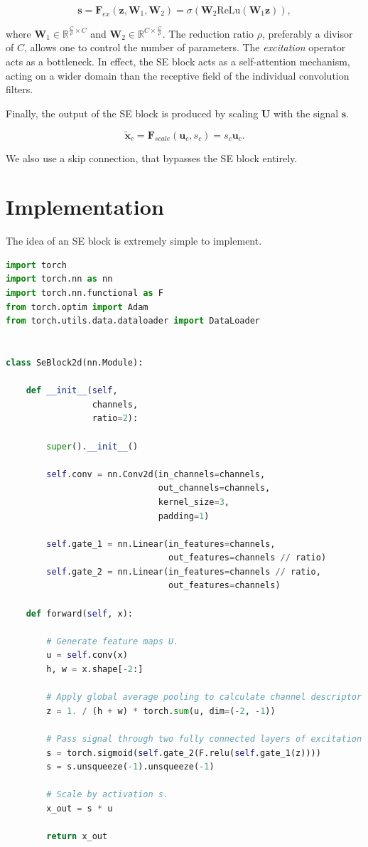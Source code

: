 \documentclass[6pt,oneside]{article}
\newcommand{\Real}{\mathbb{R}}
\newcommand{\vect}[1]{\boldsymbol{#1}}
\begin{document}
$$
\vect{s} = \vect{F}_{ex}(\vect{z}, \vect{W}_1, \vect{W}_2)
=
\sigma( \vect{W}_2\mathrm{ReLu}(\vect{W}_1\vect{z})),
$$

where $\vect{W}_1 \in \Real^{\frac{C}{\rho}\times C}$ and $\vect{W}_2 \in \Real^{C\times\frac{C}{\rho}}$.
The reduction ratio $\rho$, preferably a divisor of $C$, allows one to control the number of parameters.
The \emph{excitation} operator acts as a bottleneck. In effect, the SE block acts as a self-attention
mechanism, acting on a wider domain than the receptive field of the individual convolution filters.

Finally, the output of the SE block is produced by scaling $\vect{U}$ with the signal $\vect{s}$.

$$
\tilde{\vect{x}}_c = \vect{F}_{scale}(\vect{u}_c, s_c) = s_c\vect{u}_c.
$$

We also use a skip connection, that bypasses the SE block entirely.

\newpage

\section{Implementation}

The idea of an SE block is extremely simple to implement.

\begin{lstlisting}[language=Python]
import torch
import torch.nn as nn
import torch.nn.functional as F
from torch.optim import Adam
from torch.utils.data.dataloader import DataLoader


class SeBlock2d(nn.Module):

    def __init__(self,
                 channels, 
                 ratio=2):

        super().__init__()

        self.conv = nn.Conv2d(in_channels=channels, 
                              out_channels=channels,
                              kernel_size=3,
                              padding=1)

        self.gate_1 = nn.Linear(in_features=channels,
                                out_features=channels // ratio)
        self.gate_2 = nn.Linear(in_features=channels // ratio,
                                out_features=channels)

    def forward(self, x):

        # Generate feature maps U.
        u = self.conv(x)
        h, w = x.shape[-2:]

        # Apply global average pooling to calculate channel descriptor z.
        z = 1. / (h + w) * torch.sum(u, dim=(-2, -1))

        # Pass signal through two fully connected layers of excitation operator.
        s = torch.sigmoid(self.gate_2(F.relu(self.gate_1(z))))
        s = s.unsqueeze(-1).unsqueeze(-1)

        # Scale by activation s.
        x_out = s * u

        return x_out

\end{lstlisting}
\end{document}
